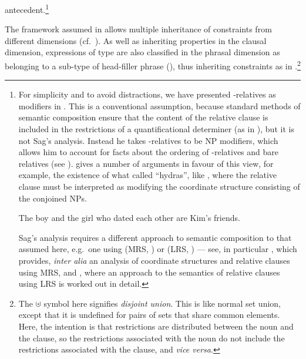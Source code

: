 \documentclass[output=paper
 	        ,biblatex
                ,babelshorthands
                ,newtxmath
                ,draftmode
                ,colorlinks, citecolor=brown
]{langscibook}
\begin{document}
antecedent.\footnote{\label{fn:rc-2}For simplicity and to avoid distractions, we have
  presented -relatives as  modifiers in . This is a conventional
  assumption, because standard methods of semantic composition ensure that the content of
  the relative clause is included in the restrictions of a quantificational determiner (as
  in ), but it is not Sag's analysis. Instead he takes
  -relatives to be NP modifiers, which allows him to account for facts about the
  ordering of -relatives and bare relatives (see
  \citealt[465--469]{Sag:97}). \cite[293--294]{Kiss2005a} gives a number of arguments in
  favour of this view, for example, the existence of what \cite{Link84a-u} called
  ``hydras'', like , where the relative clause must be interpreted as modifying
  the coordinate structure consisting of the conjoined NPs.
  \begin{exe}
    \ex\label{x:rc-45} The boy and the girl who dated each other are
    Kim's friends.
  \end{exe}
  Sag's analysis requires a different approach to semantic composition to that assumed
  here, e.g.\ one using  (MRS, \citealt{CFPS2005a}) or  (LRS, \citealt{richtersailer-lrs04}) --- see, in  particular
  \cite{chaves07}, which provides, \emph{inter alia} an analysis of coordinate structures and
  relative clauses using MRS, and \cite{Walker2017}, where an approach to the semantics of relative clauses using LRS is worked out in detail.}
\begin{exe}\ex\label{x:rc-46}
 \end{exe}
The framework assumed in \cite{Sag:97} allows multiple inheritance of
constraints from different dimensions (cf.\ ). As well as inheriting
properties in the clausal dimension, expressions of type  are
also classified in the phrasal dimension as belonging to a sub-type of head-filler phrase
(), thus inheriting constraints as in .\footnote{The
  $\uplus$ symbol here signifies \emph{disjoint union}. This is like normal set union,
  except that it is undefined for pairs of sets that share common elements. Here, the
  intention is that restrictions are distributed between the noun and
  the clause, so the restrictions associated with the noun do not include the restrictions
  associated with the clause, and \emph{vice versa}.}
\end{document}
